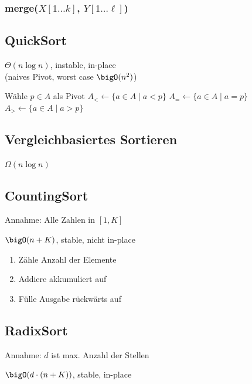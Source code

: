 \begin{algorithm}[H]
\end{algorithm}

\subsubsection*{merge($X[1\ldots k]$, $Y[1\ldots \ell]$)}
\begin{algorithm}[H]
\end{algorithm}

\subsection*{QuickSort}
$\Theta(n \log n)$, instable, in-place\\
(naives Pivot, worst case $\bigO(n^2)$)

\begin{algorithm}[H]
	Wähle $p\in A$ als Pivot\;
	$A_{<} \gets \{a\in A \mid a < p\}$\;
	$A_{=} \gets \{a\in A \mid a = p\}$\;
	$A_{>} \gets \{a\in A \mid a > p\}$\;
	\KwRet [QSort($A_{<}$), $A_{=}$, QSort($A_{>}$)]\;
\end{algorithm}

\subsection*{Vergleichbasiertes Sortieren}
$\Omega(n \log n)$

\subsection*{CountingSort}
Annahme: Alle Zahlen in $[1,K]$

$\bigO(n+K)$, stable, nicht in-place
\begin{enumerate}
	\item Zähle Anzahl der Elemente
	\item Addiere akkumuliert auf
	\item Fülle Ausgabe rückwärts auf
\end{enumerate}

\subsection*{RadixSort}
Annahme: $d$ ist max. Anzahl der Stellen

$\bigO(d \cdot (n + K))$, stable, in-place

\begin{algorithm}[H]
\end{algorithm}
